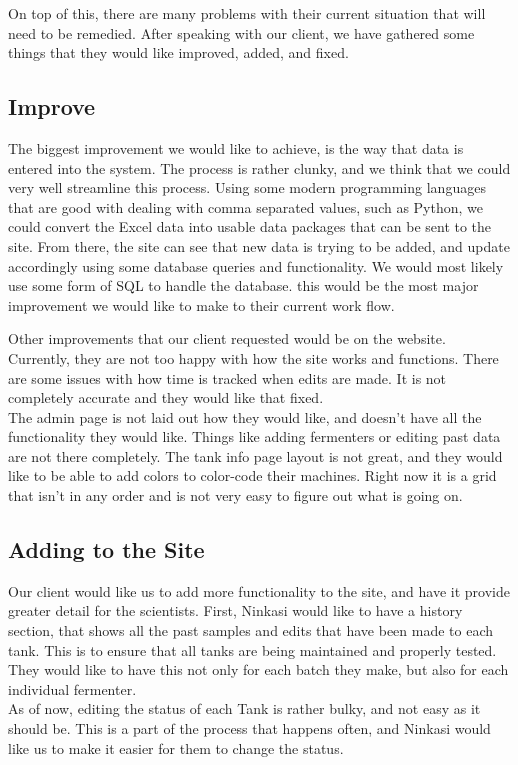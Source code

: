 \documentclass[10pt,peerreview]{IEEEtran}
\begin{document}
On top of this, there are many problems with their current situation that will need to be remedied. After speaking with our client, we have gathered some things that they would like improved, added, and fixed. 
    
\subsection{Improve}
The biggest improvement we would like to achieve, is the way that data is entered into the system. The process is rather clunky, and we think that we could very well streamline this process. Using some modern programming languages that are good with dealing with comma separated values, such as Python, we could convert the Excel data into usable data packages that can be sent to the site.
From there, the site can see that new data is trying to be added, and update accordingly using some database queries and functionality. We would most likely use some form of SQL to handle the database. this would be the most major improvement we would like to make to their current work flow.

Other improvements that our client requested would be on the website. Currently, they are not too happy with how the site works and functions. There are some issues with how time is tracked when edits are made. It is not completely accurate and they would like that fixed.\\
The admin page is not laid out how they would like, and doesn't have all the functionality they would like. Things like adding fermenters or editing past data are not there completely. The tank info page layout is not great, and they would like to be able to add colors to color-code their machines. Right now it is a grid that isn't in any order and is not very easy to figure out what is going on. 

\subsection{Adding to the Site}
    Our client would like us to add more functionality to the site, and have it provide greater detail for the scientists. First, Ninkasi would like to have a history section, that shows all the past samples and edits that have been made to each tank. This is to ensure that all tanks are being maintained and properly tested. They would like to have this not only for each batch they make, but also for each individual fermenter. \\
    As of now, editing the status of each Tank is rather bulky, and not easy as it should be. This is a part of the process that happens often, and Ninkasi would like us to make it easier for them to change the status.\\
    
\end{document}
